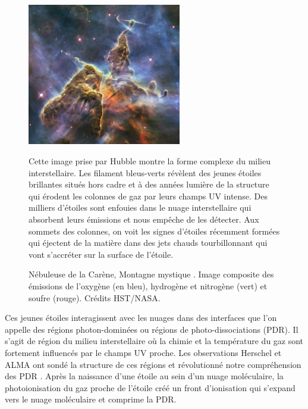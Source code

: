 \documentclass[11pt,a4paper]{article}
\begin{document}
\begin{spacing}{0.98}
\begin{figure}[!p]
    \centering
    \includegraphics[width = 0.6\textwidth]{figure/mystic.pdf}
    \caption{Nébuleuse de la Carène, \og Montagne mystique \fg{}. Image composite des émissions de l’oxygène (en bleu), hydrogène et nitrogène (vert) et soufre (rouge). Crédits HST/NASA.}
    \begin{minipage}{\textwidth}
    Cette image prise par Hubble montre la forme complexe du milieu interstellaire. Les filament bleus-verts révèlent des jeunes étoiles brillantes situés hors cadre et à des années lumière de la structure qui érodent les colonnes de gaz par leurs champs UV intense. Des milliers d'étoiles sont enfouies dans le nuage interstellaire qui absorbent leurs émissions et nous empêche de les détecter. Aux sommets des colonnes, on voit les signes d'étoiles récemment formées qui éjectent de la matière dans des jets chauds tourbillonnant qui vont s'accréter sur la surface de l'étoile.
    \end{minipage}
    \label{fig:intro:mystic}
\end{figure}

Ces jeunes étoiles interagissent avec les nuages dans des interfaces que l'on appelle des régions photon-dominées ou régions de photo-dissociations (PDR). Il s'agit de région du milieu interstellaire où la chimie et la température du gaz sont fortement influencés par le champs UV proche. Les observations Herschel et ALMA ont sondé la structure de ces régions et révolutionné notre compréhension des PDR \cite{Goicoechea2016}. Après la naissance d'une étoile au sein d'un nuage moléculaire, la photoionisation du gaz proche de l'étoile créé un front d'ionisation qui s'expand vers le nuage moléculaire et comprime la PDR. \newline 





\end{spacing}
\end{document}
